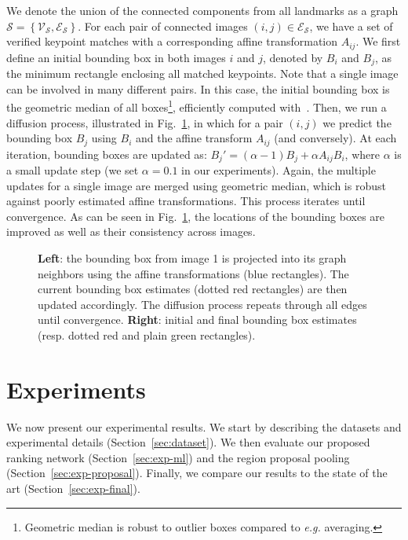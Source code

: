 \documentclass[runningheads]{llncs}
\begin{document}
We denote the union of the connected components from all landmarks as a graph $\mathcal{S}=\left\{
\mathcal{V}_{\mathcal{S}},\mathcal{E}_{\mathcal{S}}\right\} $.  For each pair of connected images
$(i,j)\in\mathcal{E}_{\mathcal{S}}$, we have a set of verified keypoint matches with a corresponding affine
transformation $A_{ij}$.  We first define an initial bounding box in both images $i$ and $j$, denoted by $B_{i}$ and
$B_{j}$, as the minimum rectangle enclosing all matched keypoints. Note that a single image can be involved in many
different pairs. In this case, the initial bounding box is the geometric median of all boxes\footnote{Geometric median
is robust to outlier boxes compared to \emph{e.g.} averaging.}, efficiently computed
with~\cite{GeoMedian2004}. Then, we run a diffusion process, illustrated in Fig.~\ref{fig:diffusion}, in which for a
pair $(i,j)$ we predict the bounding box $B_{j}$ using $B_{i}$ and the affine transform $A_{ij}$ (and conversely).  At
each iteration, bounding boxes are updated as: $B_{j}'=(\alpha-1)B_{j}+\alpha A_{ij}B_{i}$, where $\alpha$ is a small
update step (we set $\alpha=0.1$ in our experiments). Again, the multiple updates for a single image are merged using
geometric median, which is robust against poorly estimated affine transformations.  This process iterates until
convergence. As can be seen in Fig.~\ref{fig:diffusion}, the locations of the bounding boxes are improved as well as 
their consistency across images.


\begin{figure}[t!]
\begin{centering}
\par\end{centering}
\caption{\label{fig:diffusion}\textbf{Left}: the bounding box from image 1 is projected
into its graph neighbors using the affine transformations (blue rectangles). 
The current bounding box estimates (dotted red rectangles) are then updated accordingly.
The diffusion process repeats through all edges until convergence.
\textbf{Right}: initial and final bounding box estimates (resp. dotted red and plain green rectangles).}
\end{figure}


\section{Experiments}
\label{sec:exp}
We now present our experimental results.
We start by describing the datasets and experimental details (Section~\ref{sec:dataset}).
We then evaluate our proposed ranking network (Section~\ref{sec:exp-ml}) and the region proposal pooling (Section~\ref{sec:exp-proposal}).
Finally, we compare our results to the state of the art  (Section~\ref{sec:exp-final}).
\end{document}

